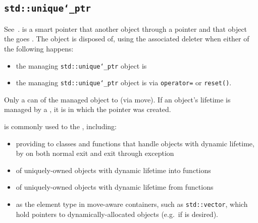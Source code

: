 \newpage
\subsection{\texttt{std::unique\char`_ptr}}
\label{subsec:unique-ptr}
See~\cite{cppreference-uniqueptr}.
\newline
{} is a smart pointer that  
another object through a pointer and  that object 
 the  goes .
\newline
The object is disposed of, using the associated deleter when either 
of the following happens:
\begin{itemize}
    \item the managing \texttt{std::unique\char`_ptr} object is 
    \item the managing \texttt{std::unique\char`_ptr} object is  via \texttt{operator=} or \texttt{reset()}. 
\end{itemize}

Only a  can 
 of the managed object to  (via move).
\newline
If an object's lifetime is managed by a 
, it is  in which the pointer was created.

 is commonly used to  the , including:
\begin{itemize}
    \item providing  to classes and functions 
          that handle objects with dynamic lifetime, 
          by  on both normal exit and 
          exit through exception 
    \item {} of uniquely-owned objects with 
          dynamic lifetime into functions 
    \item {} of uniquely-owned objects 
          with dynamic lifetime from functions 
    \item as the element type in move-aware containers, 
          such as \texttt{std::vector}, which hold pointers to 
          dynamically-allocated objects
          (e.g.\ if  is desired).             
\end{itemize}

